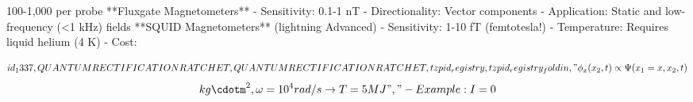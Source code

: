 
\begin{tzpsnapshot}
\end{tzpsnapshot}

100-1,000 per probe **Fluxgate Magnetometers** - Sensitivity: 0.1-1 nT - Directionality: Vector components - Application: Static and low-frequency (<1 kHz) fields **SQUID Magnetometers** (lightning Advanced) - Sensitivity: 1-10 fT (femtotesla!) - Temperature: Requires liquid helium (4 K) - Cost:

\[
id_1337,QUANTUM RECTIFICATION RATCHET,QUANTUM RECTIFICATION RATCHET,tzpid_registry,tzpid_registry_foldin,"\phi_x(x_2,t) \propto \Psi(x_1=x,x_2,t)
\]
\[
kg\cdotm^2, \omega = 10^4 rad/s \to T = 5 MJ","- Example: I = 0
\]

